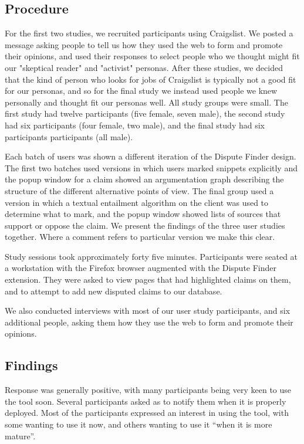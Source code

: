 \documentclass{www2010-submission}
\newcommand{\todo}[1]{}
\begin{document}
\subsection{Procedure}

For the first two studies, we recruited participants using Craigslist. We posted a message asking people to tell us how they used the web to form and promote their opinions, and used their responses to select people who we thought might fit our "skeptical reader" and "activist" personas. After these studies, we decided that the kind of person who looks for jobs of Craigslist is typically not a good fit for our personas, and so for the final study we instead used people we knew personally and thought fit our personas well. All study groups were small. The first study had twelve participants (five female, seven male), the second study had six participants (four female, two male), and the final study had six participants participants (all male). 

Each batch of users was shown a different iteration of the Dispute Finder design. The first two batches used versions in which users marked snippets explicitly and the popup window for a claim showed an argumentation graph describing the structure of the different alternative points of view. The final group used a version in which a textual entailment algorithm on the client was used to determine what to mark, and the popup window showed lists of sources that support or oppose the claim. We present the findings of the three user studies together. Where a comment refers to particular version we make this clear.

Study sessions took approximately forty five minutes. Participants were seated at a workstation with the Firefox browser augmented with the Dispute Finder extension. They were asked to view pages that had highlighted claims on them, and to attempt to add new disputed claims to our database.

We also conducted interviews with most of our user study participants, and six additional people, asking them how they use the web to form and promote their opinions.

\todo{Need to finish the third wave of user studies}

\subsection{Findings}

Response was generally positive, with many participants being very keen to use the tool soon. Several participants asked as to notify them when it is properly deployed. Most of the participants expressed an interest in using the tool, with some wanting to use it now, and others wanting to use it ``when it is more mature''.
\end{document}
